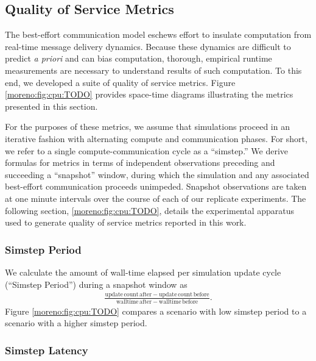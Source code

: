 \subsection{Quality of Service Metrics} \label{sec:quality-of-service-metrics}

The best-effort communication model eschews effort to insulate computation from real-time message delivery dynamics.
Because these dynamics are difficult to predict \textit{a priori} and can bias computation, thorough, empirical runtime measurements are necessary to understand results of such computation.
To this end, we developed a suite of quality of service metrics.
Figure \ref{moreno:fig:cpu:TODO} provides space-time diagrams illustrating the metrics presented in this section.

For the purposes of these metrics, we assume that simulations proceed in an iterative fashion with alternating compute and communication phases.
For short, we refer to a single compute-communication cycle as a ``simstep.''
We derive formulas for metrics in terms of independent observations preceding and succeeding a ``snapshot'' window, during which the simulation and any associated best-effort communication proceeds unimpeded.
Snapshot observations are taken at one minute intervals over the course of each of our replicate experiments.
The following section, \ref{moreno:fig:cpu:TODO}, details the experimental apparatus used to generate quality of service metrics reported in this work.

\subsubsection{Simstep Period} \label{moreno:sec:simstep-period-metric}

We calculate the amount of wall-time elapsed per simulation update cycle (``Simstep Period'') during a snapshot window as
\begin{align*}
\frac{
  \mathrm{update\,count\,after} - \mathrm{update\,count\,before}
}{
  \mathrm{walltime\,after} - \mathrm{walltime\,before}
}.
\end{align*}
Figure \ref{moreno:fig:cpu:TODO} compares a scenario with low simstep period to a scenario with a higher simstep period.

\subsubsection{Simstep Latency} \label{moreno:sec:wall-time-latency-metric}

